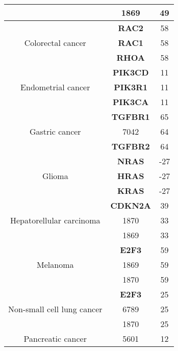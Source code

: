 \begin{table}[h!]
\begin{tabular}{|c|c|c|}
    \cline{2-3} & 1869 & 49 \\
    \hline\multirow{3}{*}{Colorectal cancer} & \textbf{RAC2} & 58 \\ 

    \cline{2-3} & \textbf{RAC1} & 58 \\
    
    \cline{2-3} & \textbf{RHOA} & 58 \\
    \hline\multirow{3}{*}{Endometrial cancer} & \textbf{PIK3CD} & 11 \\ 

    \cline{2-3} & \textbf{PIK3R1} & 11 \\
    
    \cline{2-3} & \textbf{PIK3CA} & 11 \\
    \hline\multirow{3}{*}{Gastric cancer} & \textbf{TGFBR1} & 65 \\ 

    \cline{2-3} & 7042 & 64 \\
    
    \cline{2-3} & \textbf{TGFBR2} & 64 \\
    \hline\multirow{3}{*}{Glioma} & \textbf{NRAS} & -27 \\ 

    \cline{2-3} & \textbf{HRAS} & -27 \\
    
    \cline{2-3} & \textbf{KRAS} & -27 \\
    \hline\multirow{3}{*}{Hepatorellular carcinoma} & \textbf{CDKN2A} & 39 \\ 

    \cline{2-3} & 1870 & 33 \\
    
    \cline{2-3} & 1869 & 33 \\
    \hline\multirow{3}{*}{Melanoma} & \textbf{E2F3} & 59 \\ 

    \cline{2-3} & 1869 & 59 \\
    
    \cline{2-3} & 1870 & 59 \\
    \hline\multirow{3}{*}{Non-small cell lung cancer} & \textbf{E2F3} & 25 \\ 

    \cline{2-3} & 6789 & 25 \\
    
    \cline{2-3} & 1870 & 25 \\
    \hline\multirow{3}{*}{Pancreatic cancer} & 5601 & 12 \\ 


\end{tabular}
\end{table}
